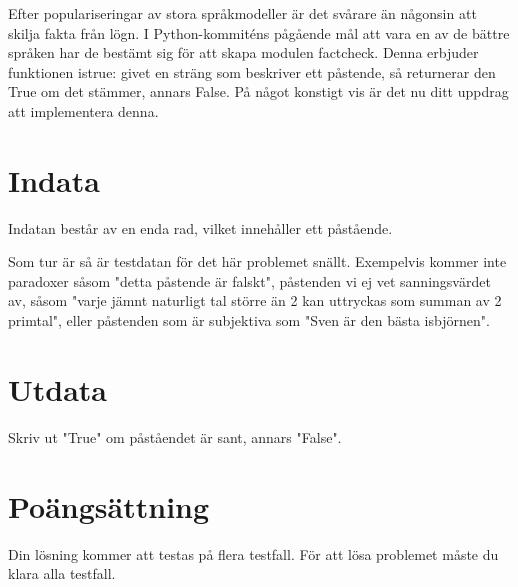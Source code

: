 \noindent
Efter populariseringar av stora språkmodeller är det svårare än någonsin att skilja
fakta från lögn. I Python-kommiténs pågående mål att vara en av de bättre språken har
de bestämt sig för att skapa modulen factcheck. Denna erbjuder funktionen istrue:
givet en sträng som beskriver ett påstende, så returnerar den True om det stämmer,
annars False. På något konstigt vis är det nu ditt uppdrag att implementera denna.


\section*{Indata}
\noindent
Indatan består av en enda rad, vilket innehåller ett påstående.

Som tur är så är testdatan för det här problemet snällt. Exempelvis kommer inte paradoxer
såsom "detta påstende är falskt", påstenden vi ej vet sanningsvärdet av, såsom "varje
jämnt naturligt tal större än 2 kan uttryckas som summan av 2 primtal", eller påstenden
som är subjektiva som "Sven är den bästa isbjörnen".

\section*{Utdata}
\noindent
Skriv ut "True" om påståendet är sant, annars "False".

\section*{Poängsättning}
Din lösning kommer att testas på flera testfall.
\noindent
För att lösa problemet måste du klara alla testfall.
